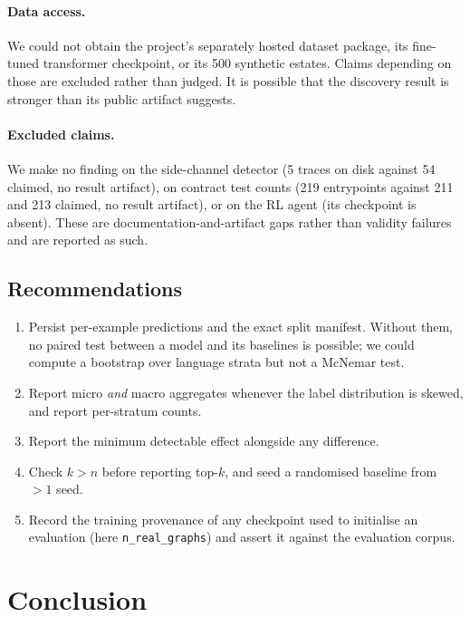 \documentclass[conference]{IEEEtran}
\newcommand{\code}[1]{\texttt{\small #1}}
\begin{document}
\paragraph{Data access.} We could not obtain the project's separately hosted dataset
package, its fine-tuned transformer checkpoint, or its 500 synthetic estates. Claims
depending on those are excluded rather than judged. It is possible that the discovery
result is stronger than its public artifact suggests.

\paragraph{Excluded claims.} We make no finding on the side-channel detector (5 traces on
disk against 54 claimed, no result artifact), on contract test counts (219 entrypoints
against 211 and 213 claimed, no result artifact), or on the RL agent (its checkpoint is
absent). These are documentation-and-artifact gaps rather than validity failures and are
reported as such.

\subsection{Recommendations}

\begin{enumerate}
\itemsep1pt
\item Persist per-example predictions and the exact split manifest. Without them, no
paired test between a model and its baselines is possible; we could compute a bootstrap
over language strata but not a McNemar test.
\item Report micro \emph{and} macro aggregates whenever the label distribution is
skewed, and report per-stratum counts.
\item Report the minimum detectable effect alongside any difference.
\item Check $k>n$ before reporting top-\(k\), and seed a randomised baseline from
$>1$ seed.
\item Record the training provenance of any checkpoint used to initialise an evaluation
(here \code{n\_real\_graphs}) and assert it against the evaluation corpus.
\end{enumerate}

\section{Conclusion}
\end{document}
